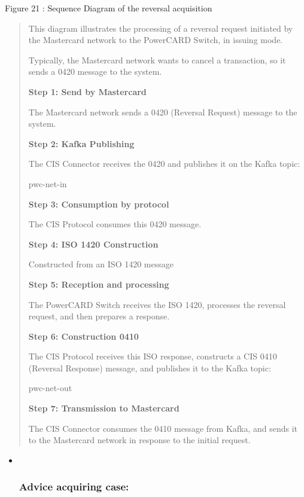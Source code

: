 \documentclass[12pt,a4paper]{report}
\begin{document}
\protect\hypertarget{_Toc201954497}{}{}Figure 21 : Sequence Diagram of
the reversal acquisition

\begin{quote}
This diagram illustrates the processing of a reversal request initiated
by the Mastercard network to the PowerCARD Switch, in issuing mode.

Typically, the Mastercard network wants to cancel a transaction, so it
sends a 0420 message to the system.

\textbf{Step 1: Send by Mastercard}

The Mastercard network sends a 0420 (Reversal Request) message to the
system.

\textbf{Step 2: Kafka Publishing}

The CIS Connector receives the 0420 and publishes it on the Kafka topic:

pwc-net-in

\textbf{Step 3: Consumption by protocol}

The CIS Protocol consumes this 0420 message.

\textbf{Step 4: ISO 1420 Construction}

Constructed from an ISO 1420 message

\textbf{Step 5: Reception and processing}

The PowerCARD Switch receives the ISO 1420, processes the reversal
request, and then prepares a response.

\textbf{Step 6: Construction 0410}

The CIS Protocol receives this ISO response, constructs a CIS 0410
(Reversal Response) message, and publishes it to the Kafka topic:

pwc-net-out

\textbf{Step 7: Transmission to Mastercard}

The CIS Connector consumes the 0410 message from Kafka, and sends it to
the Mastercard network in response to the initial request.
\end{quote}

\begin{itemize}
\item ~
  \hypertarget{advice-acquiring-case}{%
  \subsubsection{\texorpdfstring{\textbf{Advice acquiring
  case:}}{Advice acquiring case:}}\label{advice-acquiring-case}}
\end{itemize}
\end{document}
